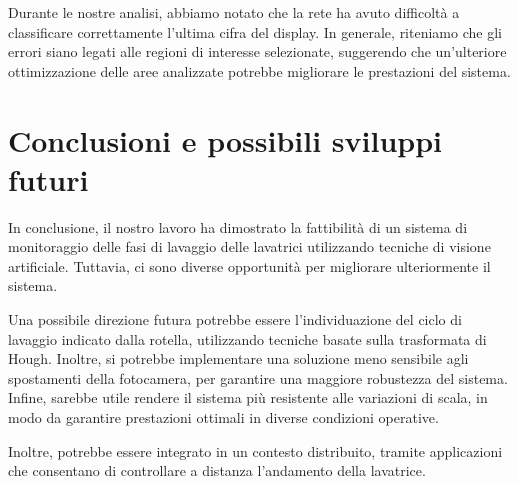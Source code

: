 \documentclass{article}
\begin{document}
\par Durante le nostre analisi, abbiamo notato che la rete ha avuto
difficoltà a classificare correttamente l'ultima cifra del display. In
generale, riteniamo che gli errori siano legati alle regioni di
interesse selezionate, suggerendo che un'ulteriore ottimizzazione delle
aree analizzate potrebbe migliorare le prestazioni del sistema.

\section{Conclusioni e possibili sviluppi
futuri}\label{conclusioni-e-possibili-sviluppi-futuri}

\par In conclusione, il nostro lavoro ha dimostrato la fattibilità di un
sistema di monitoraggio delle fasi di lavaggio delle lavatrici
utilizzando tecniche di visione artificiale. Tuttavia, ci sono diverse
opportunità per migliorare ulteriormente il sistema.

\par Una possibile direzione futura potrebbe essere l'individuazione del
ciclo di lavaggio indicato dalla rotella, utilizzando tecniche basate
sulla trasformata di Hough. Inoltre, si potrebbe implementare una
soluzione meno sensibile agli spostamenti della fotocamera, per
garantire una maggiore robustezza del sistema. Infine, sarebbe utile
rendere il sistema più resistente alle variazioni di scala, in modo da
garantire prestazioni ottimali in diverse condizioni operative.

\par Inoltre, potrebbe essere integrato in un contesto distribuito, tramite
applicazioni che consentano di controllare a distanza l'andamento della
lavatrice.


\end{document}
